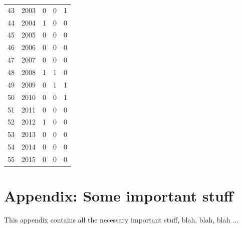 \documentclass[english, twoside, 12pt, a4paper]{article}
\theoremstyle{definition}
\theoremstyle{plain}
\theoremstyle{remark}
\begin{document}
\begin{longtable}{rrrrr}
  43 & 2003 & 0         & 0      & 1                              \\ 
  44 & 2004 & 1         & 0      & 0                              \\ 
  45 & 2005 & 0         & 0      & 0                              \\ 
  46 & 2006 & 0         & 0      & 0                              \\ 
  47 & 2007 & 0         & 0      & 0                              \\ 
  48 & 2008 & 1         & 1      & 0                              \\ 
  49 & 2009 & 0         & 1      & 1                              \\ 
  50 & 2010 & 0         & 0      & 1                              \\ 
  51 & 2011 & 0         & 0      & 0                              \\ 
  52 & 2012 & 1         & 0      & 0                              \\ 
  53 & 2013 & 0         & 0      & 0                              \\ 
  54 & 2014 & 0         & 0      & 0                              \\ 
  55 & 2015 & 0         & 0      & 0                              \\ 
   \hline
\end{longtable}




\appendix

\clearpage
\section{Appendix: Some important stuff}

This appendix contains all the necessary important stuff, blah, blah, blah ...
\end{document}
